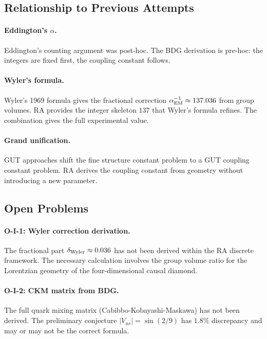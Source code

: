 \documentclass[12pt,a4paper]{article}
\begin{document}
\subsection{Relationship to Previous Attempts}

\paragraph{Eddington's $\alpha$.}  Eddington's counting argument was post-hoc.  The BDG derivation is pre-hoc: the integers are fixed first, the coupling constant follows.

\paragraph{Wyler's formula.}  Wyler's 1969 formula \cite{Wyler1969} gives the fractional correction $\alpha_{\rm EM}^{-1}\approx137.036$ from group volumes.  RA provides the integer skeleton $137$ that Wyler's formula refines.  The combination gives the full experimental value.

\paragraph{Grand unification.}  GUT approaches shift the fine structure constant problem to a GUT coupling constant problem.  RA derives the coupling constant from geometry without introducing a new parameter.

\subsection{Open Problems}

\paragraph{O-I-1: Wyler correction derivation.}  The fractional part $\delta_{\rm Wyler}\approx0.036$ has not been derived within the RA discrete framework.  The necessary calculation involves the group volume ratio for the Lorentzian geometry of the four-dimensional causal diamond.

\paragraph{O-I-2: CKM matrix from BDG.}  The full quark mixing matrix (Cabibbo-Kobayashi-Maskawa) has not been derived.  The preliminary conjecture $|V_{us}|=\sin(2/9)$ has $1.8\%$ discrepancy and may or may not be the correct formula.
\end{document}

